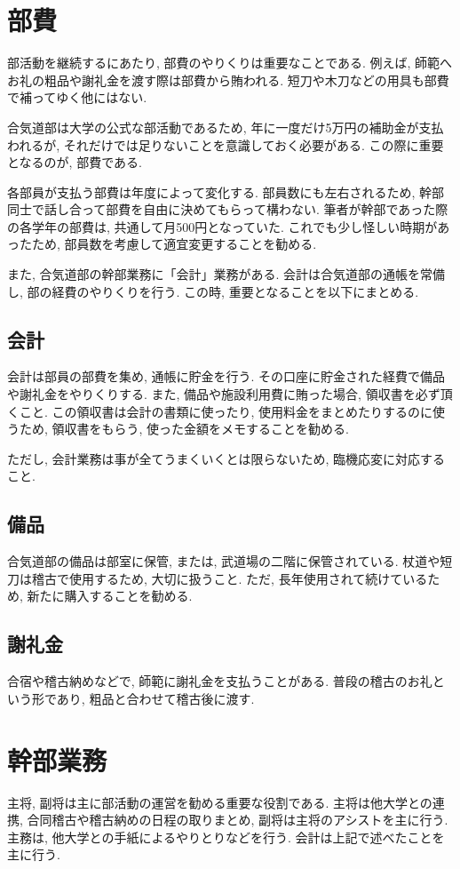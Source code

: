 \documentclass[a4j,titlepage]{jarticle}
\begin{document}
\section{部費}
部活動を継続するにあたり, 部費のやりくりは重要なことである. 例えば, 師範へお礼の粗品や謝礼金を渡す際は部費から賄われる. 短刀や木刀などの用具も部費で補ってゆく他にはない. \par
合気道部は大学の公式な部活動であるため, 年に一度だけ5万円の補助金が支払われるが, それだけでは足りないことを意識しておく必要がある. この際に重要となるのが, 部費である. \par
各部員が支払う部費は年度によって変化する. 部員数にも左右されるため, 幹部同士で話し合って部費を自由に決めてもらって構わない. 筆者が幹部であった際の各学年の部費は, 共通して月500円となっていた. これでも少し怪しい時期があったため, 部員数を考慮して適宜変更することを勧める. \par
また, 合気道部の幹部業務に「会計」業務がある. 会計は合気道部の通帳を常備し, 部の経費のやりくりを行う. この時, 重要となることを以下にまとめる.

\subsection{会計}
会計は部員の部費を集め, 通帳に貯金を行う. その口座に貯金された経費で備品や謝礼金をやりくりする. また, 備品や施設利用費に賄った場合, 領収書を必ず頂くこと. この領収書は会計の書類に使ったり, 使用料金をまとめたりするのに使うため, 領収書をもらう, 使った金額をメモすることを勧める. \par
ただし, 会計業務は事が全てうまくいくとは限らないため, 臨機応変に対応すること. 

\subsection{備品}
合気道部の備品は部室に保管, または, 武道場の二階に保管されている. 杖道や短刀は稽古で使用するため, 大切に扱うこと. ただ, 長年使用されて続けているため, 新たに購入することを勧める. 

\subsection{謝礼金}
合宿や稽古納めなどで, 師範に謝礼金を支払うことがある. 普段の稽古のお礼という形であり, 粗品と合わせて稽古後に渡す. 

\section{幹部業務}
主将, 副将は主に部活動の運営を勧める重要な役割である. 主将は他大学との連携, 合同稽古や稽古納めの日程の取りまとめ, 副将は主将のアシストを主に行う. 主務は, 他大学との手紙によるやりとりなどを行う. 会計は上記で述べたことを主に行う. 
\end{document}
